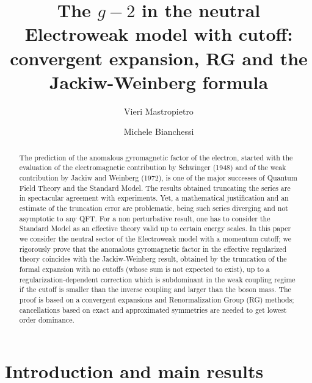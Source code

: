 \documentclass[a4paper, 11pt]{article}
\title{ \bfseries \sffamily \Large The $g-2$ in the neutral Electroweak model with cutoff: convergent expansion, RG and the Jackiw-Weinberg formula}
\author[1]{Vieri Mastropietro}
\author[2]{Michele Bianchessi}
\affil[1]{Università degli Studi di Roma ``La Sapienza'', Department of Physics, Rome -- Italy}
\affil[2]{Università degli Studi Roma Tre, Department of Mathematics and Physics, Rome -- Italy}
\theoremstyle{thm}
\begin{document}
\maketitle

\begin{abstract}
The prediction of the anomalous gyromagnetic factor of the electron,
started with the evaluation of the electromagnetic contribution by
Schwinger (1948) and 
of the weak contribution by Jackiw and Weinberg (1972), 
is one of the major successes of Quantum Field Theory and the Standard Model. 
The results obtained truncating the
series are in spectacular agreement with experiments. Yet, a mathematical justification and 
an estimate of the truncation error are problematic, being such series diverging and not asymptotic to any QFT.
For a non perturbative result, one has to consider the Standard Model as an effective theory 
valid up to certain energy scales.
In this paper we 
consider the neutral sector of the Electroweak model 
with a momentum cutoff; we rigorously prove that 
the anomalous gyromagnetic factor in the effective regularized theory 
coincides with the Jackiw-Weinberg result, obtained by the truncation of the formal expansion with no cutoffs (whose sum is not expected to exist), up to a regularization-dependent correction
which is subdominant in the weak coupling regime if the cutoff is smaller than the inverse coupling and larger than the boson mass.
The proof is based on a convergent expansions and Renormalization Group (RG) methods; cancellations
based on exact and approximated symmetries are needed to get lowest order dominance.
\end{abstract}

\newpage

\tableofcontents

\newpage

\section{Introduction and main results}  
\label{sec:introduction}
\end{document}
